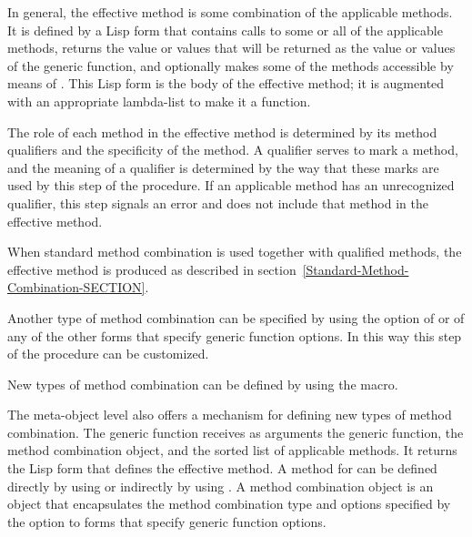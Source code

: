 In general, the effective method is some combination of the applicable
methods.  It is defined by a Lisp form that contains calls to some or all
of the applicable methods, returns the value or values that will be
returned as the value or values of the generic function, and optionally
makes some of the methods accessible by means of .
This Lisp form is the body of the effective method; it is augmented with
an appropriate lambda-list to make it a function.

The role of each method in the effective method is determined by its
method qualifiers and the specificity of the method.  A qualifier
serves to mark a method, and the meaning of a qualifier is
determined by the way that these marks are used by this step
of the procedure.  If an applicable method has an unrecognized
qualifier, this step signals an error and does not include that method
in the effective method.

When standard method combination is used together with qualified methods, 
the effective method is produced as described in
section~\ref{Standard-Method-Combination-SECTION}.

Another type of method combination can be specified by using the 
 option of  or of any of the other
forms that specify generic function options.  In this way this step of
the procedure can be customized.

New types of method combination can be defined by using the 
 macro. 


The meta-object level also offers a mechanism for defining new types
of method combination.  The generic function 
 receives as arguments the generic function,
the method combination object, and the sorted list of applicable
methods.  It returns the Lisp form that defines the effective method.
A method for  can be defined directly by
using  or indirectly by using 
.
A {\bit method combination object} is an
object that encapsulates the method combination type and options
specified by the  option to forms that
specify generic function options.



